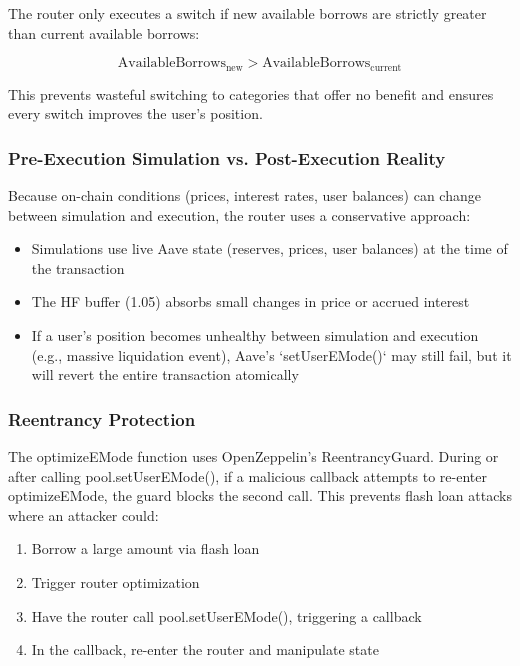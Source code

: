 The router only executes a switch if new available borrows are strictly greater than current available borrows:

\begin{equation}
\text{AvailableBorrows}_{\text{new}} > \text{AvailableBorrows}_{\text{current}}
\end{equation}

This prevents wasteful switching to categories that offer no benefit and ensures every switch improves the user's position.

\subsubsection{Pre-Execution Simulation vs. Post-Execution Reality}

Because on-chain conditions (prices, interest rates, user balances) can change between simulation and execution, the router uses a conservative approach:

\begin{itemize}
    \item Simulations use live Aave state (reserves, prices, user balances) at the time of the transaction
    \item The HF buffer (1.05) absorbs small changes in price or accrued interest
    \item If a user's position becomes unhealthy between simulation and execution (e.g., massive liquidation event), Aave's `setUserEMode()` may still fail, but it will revert the entire transaction atomically
\end{itemize}

\subsubsection{Reentrancy Protection}

The optimizeEMode function uses OpenZeppelin's ReentrancyGuard. During or after calling pool.setUserEMode(), if a malicious callback attempts to re-enter optimizeEMode, the guard blocks the second call. This prevents flash loan attacks where an attacker could:
\begin{enumerate}
    \item Borrow a large amount via flash loan
    \item Trigger router optimization
    \item Have the router call pool.setUserEMode(), triggering a callback
    \item In the callback, re-enter the router and manipulate state
\end{enumerate}

